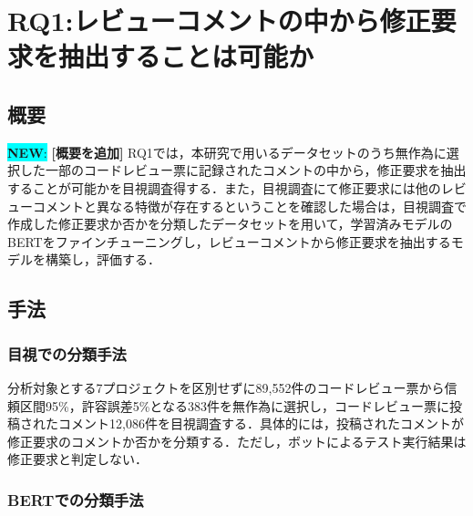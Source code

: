 \documentclass[11pt]{jreport}
\newcommand{\RQOne}{レビューコメントの中から修正要求を抽出することは可能か}
\newcommand{\todo}[1]{\colorbox{yellow}{{\bf TODO}:}{\color{red} {\textbf{[#1]}}}}
\newcommand{\new}[1]{\colorbox{cyan}{{\bf NEW}:}{\color{black} {\textbf{[#1]}}}}
\begin{document}
\chapter{RQ1:\RQOne}\label{chap:RQ1}

\section{概要}

\new{概要を追加}
RQ1では，本研究で用いるデータセットのうち無作為に選択した一部のコードレビュー票に記録されたコメントの中から，修正要求を抽出することが可能かを目視調査得する．また，目視調査にて修正要求には他のレビューコメントと異なる特徴が存在するということを確認した場合は，目視調査で作成した修正要求か否かを分類したデータセットを用いて，学習済みモデルのBERTをファインチューニングし，レビューコメントから修正要求を抽出するモデルを構築し，評価する．

\section{手法}
\subsection{目視での分類手法}

分析対象とする7プロジェクトを区別せずに89,552件のコードレビュー票から信頼区間95\%，許容誤差5\%となる383件を無作為に選択し，コードレビュー票に投稿されたコメント12,086件を目視調査する．具体的には，投稿されたコメントが修正要求のコメントか否かを分類する．ただし，ボットによるテスト実行結果は修正要求と判定しない．


\subsection{BERTでの分類手法}
\end{document}
